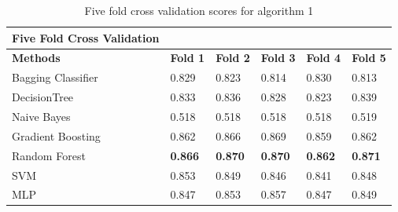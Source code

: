 \begin{table}[H]
    \centering
    \begin{tabular}{|l|l|l|l|l|l|}
    \hline
        \textbf{Five Fold Cross Validation} &  &  &  &  &  \\ \hline
        \textbf{Methods} & \textbf{Fold 1} & \textbf{Fold 2} & \textbf{Fold 3} & \textbf{Fold 4} & \textbf{Fold 5} \\ \hline
        Bagging Classifier & 0.829 & 0.823 & 0.814 & 0.830 & 0.813 \\ \hline
        DecisionTree & 0.833 & 0.836 & 0.828 & 0.823 & 0.839 \\ \hline
        Naive Bayes & 0.518 & 0.518 & 0.518 & 0.518 & 0.519 \\ \hline
        Gradient Boosting & 0.862 & 0.866 & 0.869 & 0.859 & 0.862 \\ \hline
        Random Forest & \textbf{0.866} & \textbf{0.870} & \textbf{0.870} & \textbf{0.862} & \textbf{0.871} \\ \hline
        SVM & 0.853 & 0.849 & 0.846 & 0.841 & 0.848 \\ \hline
        MLP & 0.847 & 0.853 & 0.857 & 0.847 & 0.849 \\ \hline
    \end{tabular}
    \caption{Five fold cross validation scores for algorithm 1}
    \label{table:fiveFoldCrossValidation}
\end{table}


